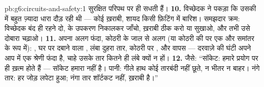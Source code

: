 \begin{solution}{pb:g6:circuits-and-safety:1}
सुरक्षित परिपथ पर ही सधती हैं।
\textbf{10.} विच्छेदक ने पकड़ा कि उसकी  में बहुत ज़्यादा धारा दौड़
रही थी --- कोई ख़राबी, शायद किसी फ़िटिंग में बारिश। समझदार क्रम:
विच्छेदक बंद ही रहने दो,  के उपकरण निकालकर जाँचो, ख़राबी ठीक करो
या सुखाओ, और तभी उसे दोबारा चढ़ाओ।
\textbf{11.} अपना अलग फंदा, कोठरी के जाल से अलग (या कोठरी की  पर
एक और समांतर  के रूप में): , घर पर दबाने वाला , लंबा
दुहरा तार, कोठरी पर , और वापस --- दरवाज़े की घंटी अपने आप में एक
श्रेणी फंदा है, चाहे उसके तार कितने ही लंबे क्यों न हों।
\textbf{12.} जैसे: ``सॉकेट: हमारे प्रयोग  पर ही ख़त्म होते हैं
--- सॉकेट हमारा नहीं है। पानी: गीले हाथ कोई तारबंदी नहीं छूते, न भीतर
न बाहर। नंगे तार: हर जोड़ लपेटा हुआ; नंगा तार शॉर्टकट नहीं, ख़राबी
है।''
\end{solution}
